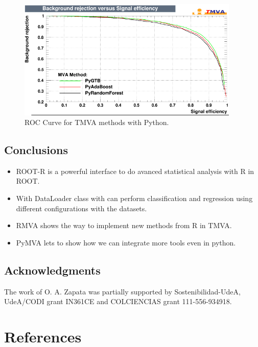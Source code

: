 \documentclass[a4paper]{jpconf}
\begin{document}
\begin{figure}[h]
\centering
\includegraphics[width=25pc]{img/pymvaroc.png}\caption{\label{pymvaroc} ROC Curve for TMVA methods with Python.}
\end{figure}

\subsection{Conclusions}
\begin{itemize}
\item ROOT-R is a powerful interface to do avanced statistical analysis with R in ROOT.
\item With DataLoader class with can perform classification and regression using different configurations with the datasets.
\item RMVA shows the way to implement new methods from R in TMVA.
\item PyMVA lets to show how we can integrate more tools even in python.
\end{itemize}


\clearpage
\subsection{Acknowledgments}
The work of O. A. Zapata was partially supported by Sostenibilidad-UdeA, UdeA/CODI grant IN361CE
and COLCIENCIAS grant 111-556-934918.\newline


\section*{References}

\end{document}
